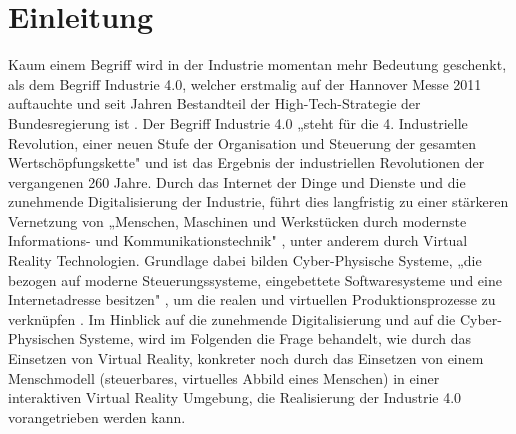 \chapter{Einleitung} \label{cha:Einleitung}	

Kaum einem Begriff wird in der Industrie momentan mehr Bedeutung geschenkt, als dem Begriff Industrie 4.0, welcher erstmalig auf der Hannover Messe 2011 auftauchte und seit Jahren Bestandteil der High-Tech-Strategie der Bundesregierung ist \cite{8}. Der Begriff Industrie 4.0 „steht für die 4. Industrielle Revolution, einer neuen Stufe der Organisation und Steuerung der gesamten Wertschöpfungskette" \cite{1} und ist das Ergebnis der industriellen Revolutionen der vergangenen 260 Jahre. Durch das Internet der Dinge und Dienste und die zunehmende Digitalisierung der Industrie, führt dies langfristig zu einer stärkeren Vernetzung von „Menschen, Maschinen und Werkstücken durch modernste Informations- und Kommunikationstechnik" \cite{6}, unter anderem durch Virtual Reality Technologien. Grundlage dabei bilden Cyber-Physische Systeme, „die bezogen auf moderne Steuerungssysteme, eingebettete Softwaresysteme und eine Internetadresse besitzen" \cite{1}, um die realen und virtuellen Produktionsprozesse zu verknüpfen \cite{11}.
\newline
Im Hinblick auf die zunehmende Digitalisierung und auf die Cyber-Physischen Systeme, wird im Folgenden die Frage behandelt, wie durch das Einsetzen von Virtual Reality, konkreter noch durch das Einsetzen von einem Menschmodell (steuerbares, virtuelles Abbild eines Menschen) in einer interaktiven Virtual Reality Umgebung, die Realisierung der Industrie 4.0 vorangetrieben werden kann.

